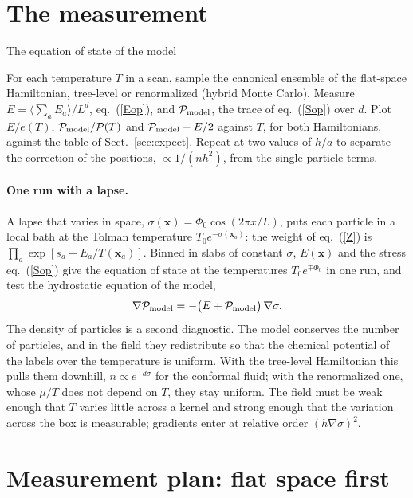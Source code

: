 \documentclass[11pt,aps,preprint,nofootinbib,superscriptaddress,tightenlines]{revtex4-2}
\newcommand{\avg}[1]{\langle #1\rangle}
\def\pr{{\mathcal P}}
\def\er{e}
\def\st{\begin{equation}}
\def\stp{\end{equation}}
\def\Eq#1{eq.~(\ref{#1})}
\def\Sect#1{Sect.~\ref{#1}}
\let\oldparagraph\paragraph
\renewcommand{\paragraph}{\par\bigskip\oldparagraph}
\begin{document}
\section{The measurement}
\label{sec:measurement}

\begin{algobox}{The equation of state of the model}
\begin{algorithmic}[1]
\State For each temperature $T$ in a scan, sample the canonical ensemble of the flat-space Hamiltonian, tree-level or renormalized (hybrid Monte Carlo).
\State Measure $E=\avg{\sum_aE_a}/L^d$, \Eq{Eop}, and $\pr_{\rm model}$, the trace of \Eq{Sop} over $d$.
\State Plot $E/\er(T)$, $\pr_{\rm model}/\pr(T)$ and $\pr_{\rm model}-E/2$ against $T$, for both Hamiltonians, against the table of \Sect{sec:expect}.
\State Repeat at two values of $h/a$ to separate the correction of the positions, $\propto1/(\bar nh^2)$, from the single-particle terms.
\end{algorithmic}
\end{algobox}

\paragraph{One run with a lapse.}  A lapse that varies in space, $\sigma(\bm x)=\Phi_0\cos(2\pi x/L)$, puts each particle in a local bath at the Tolman temperature
$T_0e^{-\sigma(\bm x_a)}$: the weight of \Eq{Z} is $\prod_a\exp[s_a-E_a/T(\bm x_a)]$.  Binned in slabs of constant $\sigma$, $E(\bm x)$ and the stress \Eq{Sop} give the
equation of state at the temperatures $T_0e^{\mp\Phi_0}$ in one run, and test the hydrostatic equation of the model,
\st
\nabla\pr_{\rm model}=-\big(E+\pr_{\rm model}\big)\,\nabla\sigma .
\stp
The density of particles is a second diagnostic.  The model conserves the number of particles, and in the field they redistribute so that the chemical potential of the
labels over the temperature is uniform.  With the tree-level Hamiltonian this pulls them downhill, $\bar n\propto e^{-d\sigma}$ for the conformal fluid; with the
renormalized one, whose $\mu/T$ does not depend on $T$, they stay uniform.  The field must be weak enough that $T$ varies little across a kernel and strong enough that
the variation across the box is measurable; gradients enter at relative order $(h\nabla\sigma)^2$.

\section{Measurement plan: flat space first}
\label{sec:plan}
\end{document}
